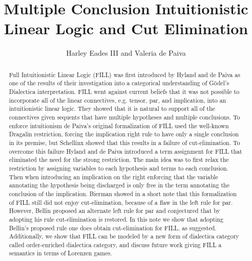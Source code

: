 \usepackage[utf8]{inputenc}
\usepackage{amssymb,amsmath,amsthm}
\usepackage{cmll}
\usepackage{stmaryrd}
\usepackage{todonotes}
\usepackage{mathpartir}
\usepackage{hyperref}



\title{Multiple Conclusion Intuitionistic Linear Logic and Cut Elimination}
\author{Harley Eades III and Valeria de Paiva}

\usepackage{color}
\usepackage{supertabular}



\renewcommand{\FILLdrulename}[1]{\scriptsize \textsc{#1}}




\maketitle

\begin{abstract}
  Full Intuitionistic Linear Logic (FILL) was first introduced by
  Hyland and de Paiva as one of the results of their investigation
  into a categorical understanding of G\"odel’s Dialectica
  interpretation. FILL went against current beliefs that it was not
  possible to incorporate all of the linear connectives, e.g. tensor,
  par, and implication, into an intuitionistic linear logic. They
  showed that it is natural to support all of the connectives given
  sequents that have multiple hypotheses and multiple conclusions. To
  enforce intuitionism de Paiva’s original formalization of FILL used
  the well-known Dragalin restriction, forcing the implication right
  rule to have only a single conclusion in its premise, but Schellinx
  showed that this results in a failure of cut-elimination. To
  overcome this failure Hyland and de Paiva introduced a term
  assignment for FILL that eliminated the need for the strong
  restriction. The main idea was to first relax the restriction by
  assigning variables to each hypothesis and terms to each conclusion.
  Then when introducing an implication on the right enforcing that the
  variable annotating the hypothesis being discharged is only free in
  the term annotating the conclusion of the implication. Bierman
  showed in a short note that this formalization of FILL still did not
  enjoy cut-elimination, because of a flaw in the left rule for
  par. However, Bellin proposed an alternate left rule for par and
  conjectured that by adopting his rule cut-elimination is
  restored. In this note we show that adopting Bellin’s proposed rule
  one does obtain cut-elimination for FILL, as
  suggested. Additionally, we show that FILL can be modeled by a new
  form of dialectica category called order-enriched dialectica
  category, and discuss future work giving FILL a semantics in terms
  of Lorenzen games.
\end{abstract}

